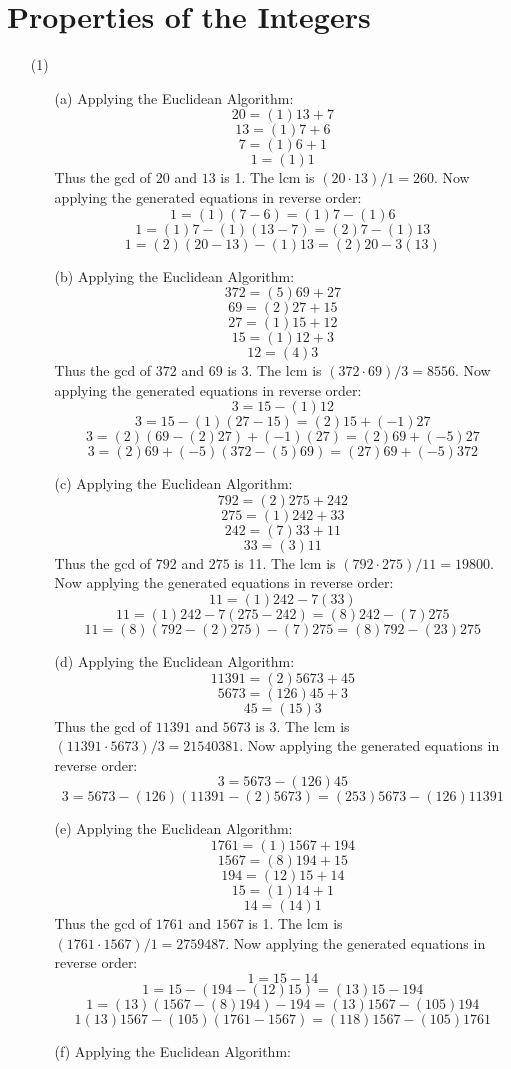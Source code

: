 \documentclass[12pt]{article}
\begin{document}
\section{Properties of the Integers}
\begin{itemize}
\item[(1)]
\begin{itemize}
\item[(a)]Applying the Euclidean Algorithm:
$$20 = (1)13 + 7$$
$$13 = (1)7 + 6$$
$$7 = (1)6 + 1$$
$$1 = (1)1$$
Thus the gcd of $20$ and $13$ is 1. The lcm is $(20 \cdot 13) / 1 = 260$. Now applying the generated equations in reverse order:
$$1 = (1)(7 - 6) = (1)7 - (1)6$$
$$1 = (1)7 - (1)(13 - 7) = (2)7 - (1)13$$
$$1 = (2)(20 - 13) - (1)13 = (2)20 - 3(13)$$
\item[(b)] Applying the Euclidean Algorithm:
$$372 = (5)69 + 27$$
$$69 = (2)27 + 15$$
$$27 = (1)15 + 12$$
$$15 = (1)12 + 3$$
$$12 = (4)3$$
Thus the gcd of $372$ and $69$ is 3. The lcm is $(372 \cdot 69) / 3 = 8556$. Now applying the generated equations in reverse order:
$$3 = 15 - (1)12$$
$$3 = 15 - (1)(27 - 15) = (2)15 + (-1)27$$
$$3 = (2)(69 - (2)27) + (-1)(27) = (2)69 + (-5)27$$
$$3 = (2)69 + (-5)(372 - (5)69) = (27)69 + (-5)372$$
\item[(c)] Applying the Euclidean Algorithm:
$$792 = (2)275 + 242$$
$$275 = (1)242 + 33$$
$$242 = (7)33 + 11$$
$$33 = (3)11$$
Thus the gcd of $792$ and $275$ is 11. The lcm is $(792 \cdot 275) / 11 = 19800$. Now applying the generated equations in reverse order:
$$11 = (1)242 - 7(33)$$
$$11 = (1)242 - 7(275 - 242) = (8)242 - (7)275$$
$$11 = (8)(792 - (2)275) - (7)275 = (8)792 - (23)275$$
\item[(d)] Applying the Euclidean Algorithm:
$$11391 = (2)5673 + 45$$
$$5673 = (126)45 + 3$$
$$45 = (15)3$$
Thus the gcd of $11391$ and $5673$ is 3. The lcm is $(11391 \cdot 5673) / 3 = 21540381$. Now applying the generated equations in reverse order:
$$3 = 5673 - (126)45$$
$$3 = 5673 - (126)(11391 - (2)5673) = (253)5673 - (126)11391$$
\item[(e)] Applying the Euclidean Algorithm:
$$1761 = (1)1567 + 194$$
$$1567 = (8)194 + 15$$
$$194 = (12)15 + 14$$
$$15 = (1)14 + 1$$
$$14 = (14)1$$
Thus the gcd of $1761$ and $1567$ is 1. The lcm is $(1761 \cdot 1567) / 1 = 2759487$. Now applying the generated equations in reverse order:
$$1 = 15 - 14$$
$$1 = 15 - (194 - (12)15) = (13)15 - 194$$
$$1 = (13)(1567 - (8)194) - 194 = (13)1567 - (105)194$$
$$1  (13)1567 - (105)(1761 - 1567) = (118)1567 - (105)1761$$
\item[(f)] Applying the Euclidean Algorithm:

\end{itemize}
\end{itemize}
\end{document}
